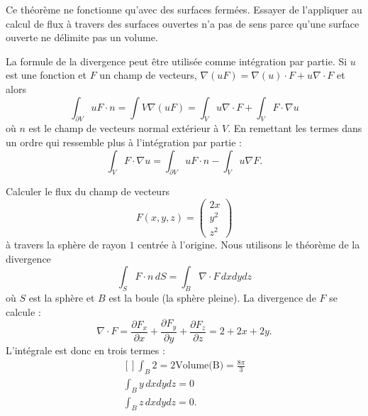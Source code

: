 \begin{remark}
	Ce théorème ne fonctionne qu'avec des surfaces fermées. Essayer de l'appliquer au calcul de flux à travers des surfaces ouvertes n'a pas de sens parce qu'une surface ouverte ne délimite pas un volume.
\end{remark}

\begin{normaltext}
	La formule de la divergence peut être utilisée comme intégration par partie. Si \( u\) est une fonction et \( F\) un champ de vecteurs, \( \nabla(uF)=\nabla(u)\cdot F+u\nabla\cdot F\) et alors
	\begin{equation}
		\int_{\partial V}uF\cdot n=\int V\nabla(uF)=\int_Vu\nabla\cdot F+\int_VF\cdot \nabla u
	\end{equation}
	où \( n\) est le champ de vecteurs normal extérieur à \( V\). En remettant les termes dans un ordre qui ressemble plus à l'intégration par partie :
	\begin{equation}        \label{EQooRUCKooUUrgxI}
		\int_{V}F\cdot \nabla u=\int_{\partial V}uF\cdot n-\int_Vu\nabla F.
	\end{equation}
\end{normaltext}

\begin{example}
	Calculer le flux du champ de vecteurs
	\begin{equation}
		F(x,y,z)=\begin{pmatrix}
			2x  \\
			y^2 \\
			z^2
		\end{pmatrix}
	\end{equation}
	à travers la sphère de rayon $1$ centrée à l'origine. Nous utilisons le théorème de la divergence
	\begin{equation}
		\int_S F\cdot n\,dS=\int_B\nabla \cdot F\,dxdydz
	\end{equation}
	où $S$ est la sphère et $B$ est la boule (la sphère pleine). La divergence de $F$ se calcule :
	\begin{equation}
		\nabla\cdot F=\frac{ \partial F_x }{ \partial x }+\frac{ \partial F_y }{ \partial y }+\frac{ \partial F_z }{ \partial z }=2+2x+2y.
	\end{equation}
	L'intégrale est donc en trois termes :
	\begin{equation}
		\begin{aligned}[]
			\int_B2=2\text{Volume(B)}=\frac{ 8\pi }{ 3 } \\
			\int_By\,dxdydz=0                            \\
			\int_Bz\,dxdydz=0.
		\end{aligned}
	\end{equation}
\end{example}

